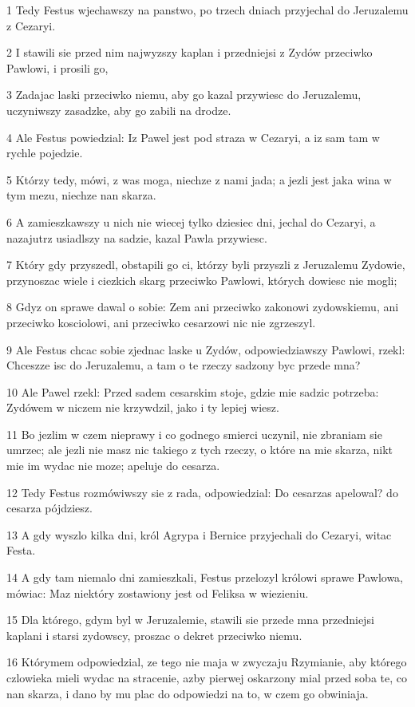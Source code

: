 \par 1 Tedy Festus wjechawszy na panstwo, po trzech dniach przyjechal do Jeruzalemu z Cezaryi.
\par 2 I stawili sie przed nim najwyzszy kaplan i przedniejsi z Zydów przeciwko Pawlowi, i prosili go,
\par 3 Zadajac laski przeciwko niemu, aby go kazal przywiesc do Jeruzalemu, uczyniwszy zasadzke, aby go zabili na drodze.
\par 4 Ale Festus powiedzial: Iz Pawel jest pod straza w Cezaryi, a iz sam tam w rychle pojedzie.
\par 5 Którzy tedy, mówi, z was moga, niechze z nami jada; a jezli jest jaka wina w tym mezu, niechze nan skarza.
\par 6 A zamieszkawszy u nich nie wiecej tylko dziesiec dni, jechal do Cezaryi, a nazajutrz usiadlszy na sadzie, kazal Pawla przywiesc.
\par 7 Który gdy przyszedl, obstapili go ci, którzy byli przyszli z Jeruzalemu Zydowie, przynoszac wiele i ciezkich skarg przeciwko Pawlowi, których dowiesc nie mogli;
\par 8 Gdyz on sprawe dawal o sobie: Zem ani przeciwko zakonowi zydowskiemu, ani przeciwko kosciolowi, ani przeciwko cesarzowi nic nie zgrzeszyl.
\par 9 Ale Festus chcac sobie zjednac laske u Zydów, odpowiedziawszy Pawlowi, rzekl: Chceszze isc do Jeruzalemu, a tam o te rzeczy sadzony byc przede mna?
\par 10 Ale Pawel rzekl: Przed sadem cesarskim stoje, gdzie mie sadzic potrzeba: Zydówem w niczem nie krzywdzil, jako i ty lepiej wiesz.
\par 11 Bo jezlim w czem nieprawy i co godnego smierci uczynil, nie zbraniam sie umrzec; ale jezli nie masz nic takiego z tych rzeczy, o które na mie skarza, nikt mie im wydac nie moze; apeluje do cesarza.
\par 12 Tedy Festus rozmówiwszy sie z rada, odpowiedzial: Do cesarzas apelowal? do cesarza pójdziesz.
\par 13 A gdy wyszlo kilka dni, król Agrypa i Bernice przyjechali do Cezaryi, witac Festa.
\par 14 A gdy tam niemalo dni zamieszkali, Festus przelozyl królowi sprawe Pawlowa, mówiac: Maz niektóry zostawiony jest od Feliksa w wiezieniu.
\par 15 Dla którego, gdym byl w Jeruzalemie, stawili sie przede mna przedniejsi kaplani i starsi zydowscy, proszac o dekret przeciwko niemu.
\par 16 Którymem odpowiedzial, ze tego nie maja w zwyczaju Rzymianie, aby którego czlowieka mieli wydac na stracenie, azby pierwej oskarzony mial przed soba te, co nan skarza, i dano by mu plac do odpowiedzi na to, w czem go obwiniaja.
